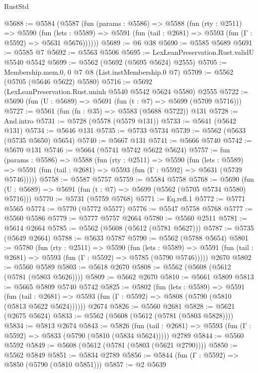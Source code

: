 \begin{lexlean}{RustStd}
\begin{coremodule}
{\begin{coremodule}
{{{{{{{{{{{{{{{{{{{{{{{{{{@5688 := @5584
    (@5587
      (fun (params : @5586) =>
      @5588
        (fun (rty : @2511) =>
        @5590
          (fun (lets : @5589) =>
          @5591 (fun (tail : @2681) => @5593 (fun (Γ : @5592) => @5631 @5676))))))
@5689 := @6 @38
@5690 := @5585 @5689
@5691 := @5585 @7
@5692 := @5563 @5506
@5695 := LexLeanPreservation.Rust.validU @5540 @5542
@5699 := @5562 (@5692 (@5695 @5624) @2555)
@5705 := Membership.mem.{0, 0} @7 @8 (List.instMembership.{0} @7)
@5709 := @5562 (@5705 (@5646 @5622) @5580)
@5716 := @5692 (LexLeanPreservation.Rust.uninh @5540 @5542 @5624 @5580) @2555
@5722 := @5690 (fun (U : @5689) => @5691 (fun (t : @7) => @5699 (@5709 @5716)))
@5727 := @5561 (fun (fn : @35) => @5583 (@5688 @5722)) @131
@5728 := And.intro
@5731 := @5728 (@5578 (@5579 @131))
@5733 := @5641 (@5642 @131)
@5734 := @5646 @131
@5735 := @5733 @5734
@5739 := @5562 (@5633 (@5735 @5650) @5654)
@5740 := @5667 @131
@5741 := @5666 @5740
@5742 := @5670 @131
@5746 := @5664 (@5741 @5742 @5622 @5624)
@5757 := fun (params : @5586) =>
  @5588
    (fun (rty : @2511) =>
    @5590
      (fun (lets : @5589) =>
      @5591 (fun (tail : @2681) => @5593 (fun (Γ : @5592) => @5631 (@5739 @5746)))))
@5758 := @5587 @5757
@5759 := @5584 @5758
@5768 := @5690 (fun (U : @5689) => @5691 (fun (t : @7) => @5699 (@5562 (@5705 @5734 @5580) @5716)))
@5770 := @5731 (@5759 @5768)
@5771 := Eq.refl.{1}
@5772 := @5771 @5565
@5774 := @5770 (@5772 @5577)
@5776 := @5547 @5758 @5768
@5777 := @5560 @5586
@5779 := @5777 @5757 @2664
@5780 := @5560 @2511
@5781 := @5614 @2664
@5785 := @5562 (@5608 (@5612 (@5781 @5627)))
@5787 := @5735 (@5649 @2664)
@5788 := @5633 @5787
@5790 := @5562 (@5788 @5654)
@5801 := @5780
    (fun (rty : @2511) =>
    @5590
      (fun (lets : @5589) =>
      @5591 (fun (tail : @2681) => @5593 (fun (Γ : @5592) => @5785 (@5790 @5746)))))
    @2670
@5802 := @5560 @5589
@5803 := @5618 @2670
@5808 := @5562 (@5608 (@5612 (@5781 (@5803 @5626))))
@5809 := @5662 @2670
@5810 := @5661 @5809
@5813 := @5665 @5809 @5740 @5742
@5825 := @5802
    (fun (lets : @5589) =>
    @5591
      (fun (tail : @2681) => @5593 (fun (Γ : @5592) => @5808 (@5790 (@5810 (@5813 @5622 @5624))))))
    @2674
@5826 := @5560 @2681
@5828 := @5621 (@2675 @5624)
@5833 := @5562 (@5608 (@5612 (@5781 (@5803 @5828))))
@5834 := @5813 @2674
@5843 := @5826
    (fun (tail : @2681) => @5593 (fun (Γ : @5592) => @5833 (@5790 (@5810 (@5834 @5624)))))
    @2789
@5844 := @5560 @5592
@5849 := @5608 (@5612 (@5781 (@5803 (@5621 @2790))))
@5850 := @5562 @5849
@5851 := @5834 @2789
@5856 := @5844 (fun (Γ : @5592) => @5850 (@5790 (@5810 @5851)))
@5857 := @2 @5639
}}}}}}}}}}}}}}}}}}}}}}}}}}
\end{coremodule}}
\end{coremodule}
\end{lexlean}
